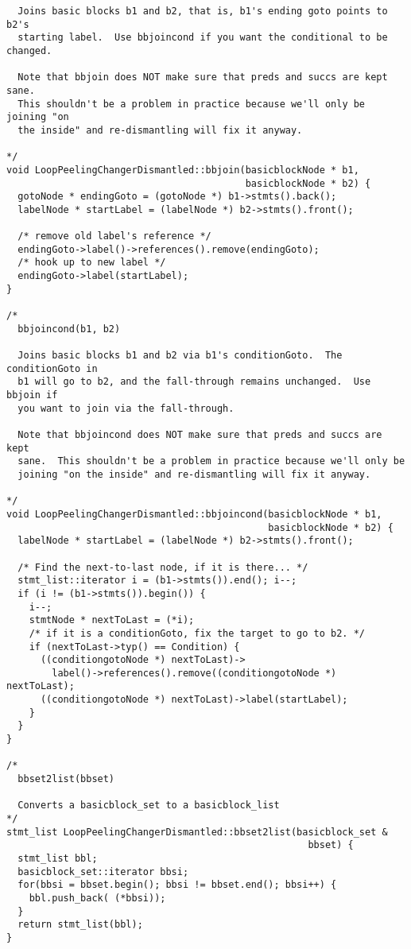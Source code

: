 \documentclass[10pt]{article}
\begin{document}
\begin{small}
\begin{verbatim}
  Joins basic blocks b1 and b2, that is, b1's ending goto points to b2's
  starting label.  Use bbjoincond if you want the conditional to be changed.

  Note that bbjoin does NOT make sure that preds and succs are kept sane.
  This shouldn't be a problem in practice because we'll only be joining "on
  the inside" and re-dismantling will fix it anyway.

*/
void LoopPeelingChangerDismantled::bbjoin(basicblockNode * b1, 
                                          basicblockNode * b2) {
  gotoNode * endingGoto = (gotoNode *) b1->stmts().back();
  labelNode * startLabel = (labelNode *) b2->stmts().front();

  /* remove old label's reference */
  endingGoto->label()->references().remove(endingGoto);
  /* hook up to new label */
  endingGoto->label(startLabel);
}

/*
  bbjoincond(b1, b2)

  Joins basic blocks b1 and b2 via b1's conditionGoto.  The conditionGoto in
  b1 will go to b2, and the fall-through remains unchanged.  Use bbjoin if
  you want to join via the fall-through.

  Note that bbjoincond does NOT make sure that preds and succs are kept
  sane.  This shouldn't be a problem in practice because we'll only be
  joining "on the inside" and re-dismantling will fix it anyway.

*/
void LoopPeelingChangerDismantled::bbjoincond(basicblockNode * b1, 
                                              basicblockNode * b2) {
  labelNode * startLabel = (labelNode *) b2->stmts().front();

  /* Find the next-to-last node, if it is there... */
  stmt_list::iterator i = (b1->stmts()).end(); i--;
  if (i != (b1->stmts()).begin()) {
    i--;
    stmtNode * nextToLast = (*i);
    /* if it is a conditionGoto, fix the target to go to b2. */
    if (nextToLast->typ() == Condition) {
      ((conditiongotoNode *) nextToLast)->
        label()->references().remove((conditiongotoNode *) nextToLast);
      ((conditiongotoNode *) nextToLast)->label(startLabel);
    }
  }
}

/*
  bbset2list(bbset)

  Converts a basicblock_set to a basicblock_list
*/
stmt_list LoopPeelingChangerDismantled::bbset2list(basicblock_set &
                                                     bbset) {
  stmt_list bbl;
  basicblock_set::iterator bbsi;
  for(bbsi = bbset.begin(); bbsi != bbset.end(); bbsi++) {
    bbl.push_back( (*bbsi));
  }
  return stmt_list(bbl);
}


\end{verbatim}
\end{small}
\end{document}
